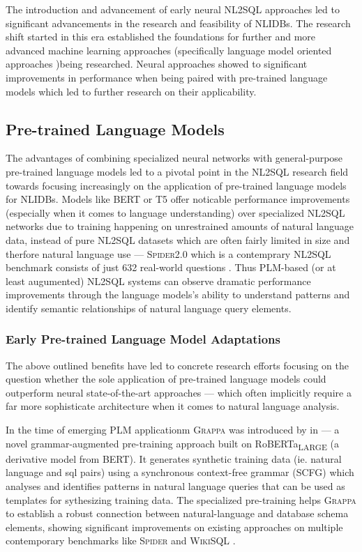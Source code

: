 \documentclass{article}
\begin{document}
The introduction and advancement of early neural NL2SQL approaches led to significant advancements in the research and feasibility of
NLIDBs. The research shift started in this era established the foundations for further and more advanced machine learning approaches
(specifically language model oriented approaches )being researched. Neural approaches showed to significant improvements in performance
when being paired with pre-trained language models \citep{RATSQL} which led to further research on their applicability.

\subsection{Pre-trained Language Models}

The advantages of combining specialized neural networks with general-purpose pre-trained language models
led to a pivotal point in the NL2SQL research field towards focusing increasingly on the application of pre-trained
language models for NLIDBs. Models like BERT or T5 offer noticable performance improvements (especially when it
comes to language understanding) over specialized NL2SQL networks due to training happening on unrestrained amounts
of natural language data, instead of pure NL2SQL datasets which are often fairly limited in size and therfore natural
language use — \textsc{Spider2.0} which is a contemprary NL2SQL benchmark consists of just 632 real-world questions 
\citep{SPIDER2}. Thus PLM-based (or at least augumented) NL2SQL systems can observe dramatic performance improvements
through the language models's ability to understand patterns and identify semantic relationships of natural language
query elements. 

\subsubsection{Early Pre-trained Language Model Adaptations}

The above outlined benefits have led to concrete research efforts focusing on the question whether the sole application
of pre-trained language models could outperform neural state-of-the-art approaches — which often implicitly require
a far more sophisticate architecture when it comes to natural language analysis.

In the time of emerging PLM applicationm \textsc{Grappa} was introduced by \citeauthor*{GRAPPA} in \citeyear{GRAPPA} —
a novel grammar-augmented pre-training approach built on RoBERTa\textsubscript{\tiny{LARGE}} (a derivative model from BERT).
It generates synthetic training data (ie. natural language and sql pairs) using a synchronous context-free grammar (SCFG)
which analyses and identifies patterns in natural language queries that can be used as templates for sythesizing training
data. The specialized pre-training helps \textsc{Grappa} to establish a robust connection between natural-language and
database schema elements, showing significant improvements on existing approaches on multiple contemporary benchmarks like 
\textsc{Spider} and \textsc{WikiSQL} \citep{GRAPPA}.
\end{document}
